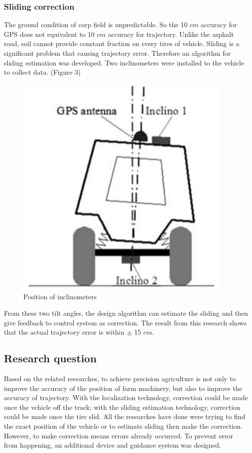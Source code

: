\documentclass[12pt]{article}
\begin{document}
\begin{flushleft}
\subsubsection{Sliding correction}
The ground condition of corp field is unpredictable. So the 10 $cm$ accuracy for GPS does not equivalent to 10 $cm$ accuracy for trajectory. Unlike the asphalt road, soil cannot provide constant fraction on every tires of vehicle. Sliding is a significant problem that causing trajectory error. Therefore an algorithm for sliding estimation was developed. Two inclinometers were installed to the vehicle to collect data. (Figure 3) 
\begin{figure}[ht!]
	\begin{center}
		\includegraphics[scale = 0.5]{slidingcorrection.png}
		\caption{Position of inclinometers}
	\end{center}
\end{figure}
From these two tilt angles, the design algorithm can estimate the sliding and then give feedback to control system as correction. The result from this research shows that the actual trajectory error is within $\pm$ 15 $cm$. \cite{lenain2006high}

\subsection{Research question}
Based on the related researches, to achieve precision agriculture is not only to improve the accuracy of the position of farm machinery, but also to improve the accuracy of trajectory. With the localization technology, correction could be made once the vehicle off the track; with the sliding estimation technology, correction could be made once the tire slid. All the researches have done were trying to find the exact position of the vehicle or to estimate sliding then make the correction. However, to make correction means errors already occurred. To prevent error from happening, an additional device and guidance system was designed.  


\end{flushleft}
\end{document}
